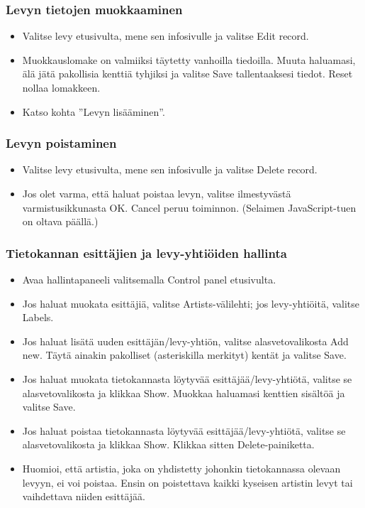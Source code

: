 \documentclass[a4paper,12pt]{report}
\begin{document}
\subsubsection{Levyn tietojen muokkaaminen}

\begin{itemize}
  \item Valitse levy etusivulta, mene sen infosivulle ja valitse Edit
    record.
  \item Muokkauslomake on valmiiksi täytetty vanhoilla tiedoilla. Muuta
    haluamasi, älä jätä pakollisia kenttiä tyhjiksi ja valitse Save
    tallentaaksesi tiedot. Reset nollaa lomakkeen.
  \item Katso kohta ''Levyn lisääminen''.
\end{itemize}

\subsubsection{Levyn poistaminen}

\begin{itemize}
  \item Valitse levy etusivulta, mene sen infosivulle ja valitse Delete record.
  \item Jos olet varma, että haluat poistaa levyn, valitse ilmestyvästä
    varmistusikkunasta OK. Cancel peruu toiminnon. (Selaimen JavaScript-tuen
    on oltava päällä.)
\end{itemize}
	
\subsubsection{Tietokannan esittäjien ja levy-yhtiöiden hallinta}

\begin{itemize}
  \item Avaa hallintapaneeli valitsemalla Control panel etusivulta.
  \item Jos haluat muokata esittäjiä, valitse Artists-välilehti; jos
    levy-yhtiöitä, valitse Labels.
  \item Jos haluat lisätä uuden esittäjän/levy-yhtiön, valitse
    alasvetovalikosta Add new. Täytä ainakin pakolliset (asteriskilla
    merkityt) kentät ja valitse Save.
  \item Jos haluat muokata tietokannasta löytyvää esittäjää/levy-yhtiötä,
    valitse se alasvetovalikosta ja klikkaa Show. Muokkaa haluamasi kenttien
    sisältöä ja valitse Save.
  \item Jos haluat poistaa tietokannasta löytyvää esittäjää/levy-yhtiötä,
    valitse se alasvetovalikosta ja klikkaa Show. Klikkaa sitten
    Delete-painiketta.
  \item Huomioi, että artistia, joka on yhdistetty johonkin tietokannassa
    olevaan levyyn, ei voi poistaa. Ensin on poistettava kaikki kyseisen
    artistin levyt tai vaihdettava niiden esittäjää.
\end{itemize}
\end{document}
